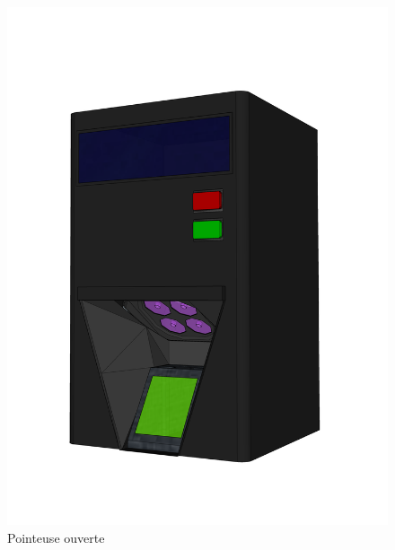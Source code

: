     \begin{figure}[!htb]
        \vspace{-40pt}
       \begin{minipage}{0.5\textwidth}
         \centering
         \includegraphics[scale=0.16]{images/prototype/3.png}
          \vspace{-40pt}
         \caption{Pointeuse ouverte}\label{ }
       \end{minipage}\hfill
       \begin{minipage}{0.5\textwidth}
         \centering

\end{minipage}
\end{figure}
